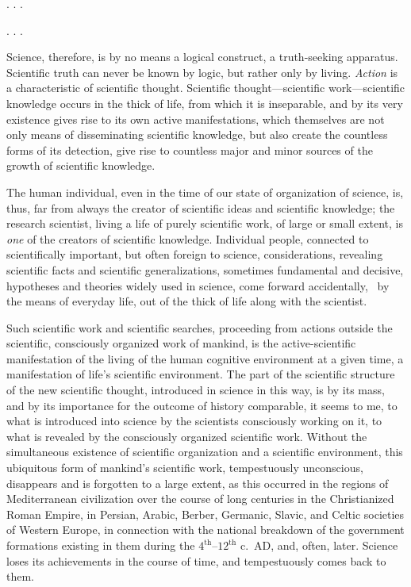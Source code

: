 . . .

\Section %

. . .

\Section %
Science, therefore, is by no means a logical construct, a truth-seeking
apparatus.  Scientific truth can never be known by logic, but rather only by
living.  \emph{Action }is a characteristic of scientific thought.  Scientific
thought---scientific work---scientific knowledge occurs in the thick of life,
from which it is inseparable, and by its very existence gives rise to its own
active manifestations, which themselves are not only means of disseminating
scientific knowledge, but also create the countless forms of its detection,
give rise to countless major and minor sources of the growth of scientific
knowledge.

The human individual, even in the time of our state of organization of science,
is, thus, far from always the creator of scientific ideas and scientific
knowledge; the research scientist, living a life of purely scientific work, of
large or small extent, is \emph{one} of the creators of scientific knowledge.
Individual people, connected to scientifically important, but often foreign to
science, considerations, revealing scientific facts and scientific
generalizations, sometimes fundamental and decisive, hypotheses and theories
widely used in science, come forward accidentally, \ie\ by the means of
everyday life, out of the thick of life along with the scientist.

Such scientific work and scientific searches, proceeding from actions outside
the scientific, consciously organized work of mankind, is the active-scientific
manifestation of the living of the human cognitive environment at a given time,
a manifestation of life's scientific environment.  The part of the scientific
structure of the new scientific thought, introduced in science in this way, is
by its mass, and by its importance for the outcome of history comparable, it
seems to me, to what is introduced into science by the scientists consciously
working on it, to what is revealed by the consciously organized scientific
work.  Without the simultaneous existence of scientific organization and a
scientific environment, this ubiquitous form of mankind's scientific work,
tempestuously unconscious, disappears and is forgotten to a large extent, as
this occurred in the regions of Mediterranean civilization over the course of
long centuries in the Christianized Roman Empire, in Persian, Arabic, Berber,
Germanic, Slavic, and Celtic societies of Western Europe, in connection with
the national breakdown of the government formations existing in them during the
$4^\mathrm{th}$--$12^\mathrm{th}$ c.\ AD, and, often, later.  Science loses its
achievements in the course of time, and tempestuously comes back to them.

